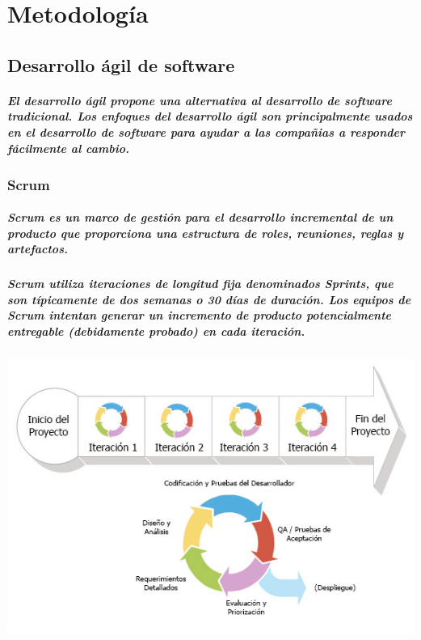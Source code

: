 \clearpage
\chapter{Metodología}

\section{Desarrollo ágil de software}
  \paragraph{El desarrollo ágil propone una alternativa al desarrollo de software tradicional. Los enfoques del desarrollo ágil son principalmente usados en el desarrollo de software para ayudar a las compañias a responder fácilmente al cambio.}

\subsection{Scrum}
  \paragraph{Scrum es un marco de gestión para el desarrollo incremental de un producto que proporciona una estructura de roles, reuniones, reglas y artefactos.}
  \paragraph{Scrum utiliza iteraciones de longitud fija denominados Sprints, que son típicamente de dos semanas o 30 días de duración. Los equipos de Scrum intentan generar un incremento de producto potencialmente entregable (debidamente probado) en cada iteración.}
  
  \begin{center}
    \includegraphics[width=14cm, height=9cm]{images/iterations}
  \end{center}

